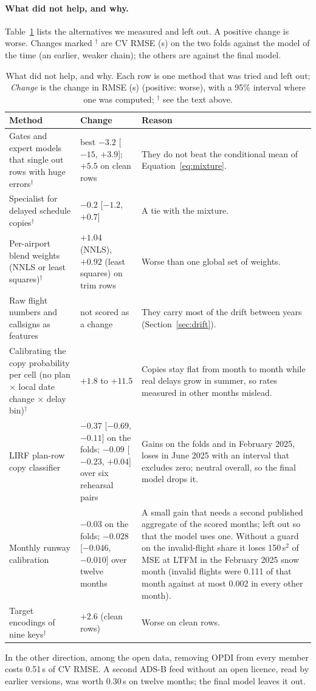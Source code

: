 \documentclass[
  manuscript=article,
  layout=preprint,
  year=2026,
  volume=x,
]{extra/joas}
\begin{document}
\paragraph{What did not help, and why.} Table~\ref{tb:negative} lists the alternatives we measured and left out. A positive
change is worse. Changes marked $^\dagger$ are CV RMSE (s) on the two folds against the model of the time (an earlier, weaker chain);
the others are against the final model.
\begin{table}[htbp!]
  \centering
  \small
  \caption{What did not help, and why. Each row is one method that was tried and left out; \emph{Change} is the change in RMSE (s)
  (positive: worse), with a 95\% interval where one was computed; $^\dagger$ see the text above.}
  \label{tb:negative}
  \begin{tabularx}{\textwidth}{@{}p{}p{}X@{}}
    \toprule
    Method & Change & Reason \\
    \midrule
    Gates and expert models that single out rows with huge errors$^\dagger$ & best $-3.2$ [$-15$, $+3.9$]; $+5.5$ on clean rows & They do not beat the conditional mean of Equation~\ref{eq:mixture}. \\
    Specialist for delayed schedule copies$^\dagger$ & $-0.2$ [$-1.2$, $+0.7$] & A tie with the mixture. \\
    Per-airport blend weights (NNLS or least squares)$^\dagger$ & $+1.04$ (NNLS), $+0.92$ (least squares) on trim rows & Worse than one global set of weights. \\
    Raw flight numbers and callsigns as features & not scored as a change & They carry most of the drift between years (Section~\ref{sec:drift}). \\
    Calibrating the copy probability per cell (no plan $\times$ local date change $\times$ delay bin)$^\dagger$ & $+1.8$ to $+11.5$ & Copies stay flat from month to month while real delays grow in summer, so rates measured in other months mislead. \\
    LIRF plan-row copy classifier & $-0.37$ [$-0.69$, $-0.11$] on the folds; $-0.09$ [$-0.23$, $+0.04$] over six rehearsal pairs & Gains on the folds and in February 2025, loses in June 2025 with an interval that excludes zero; neutral overall, so the final model drops it. \\
    Monthly runway calibration & $-0.03$ on the folds; $-0.028$ [$-0.046$, $-0.010$] over twelve months & A small gain that needs a second published aggregate of the scored months; left out so that the model uses one. Without a guard on the invalid-flight share it loses 150\,s$^2$ of MSE at LTFM in the February 2025 snow month (invalid flights were 0.111 of that month against at most 0.002 in every other month). \\
    Target encodings of nine keys$^\dagger$ & $+2.6$ (clean rows) & Worse on clean rows. \\
    \bottomrule
  \end{tabularx}
\end{table}
In the other direction, among the open data, removing OPDI from every member costs 0.51\,s of CV RMSE. A second ADS-B feed
without an open licence, read by earlier versions, was worth 0.30\,s on twelve months; the final model leaves it out.
\end{document}
